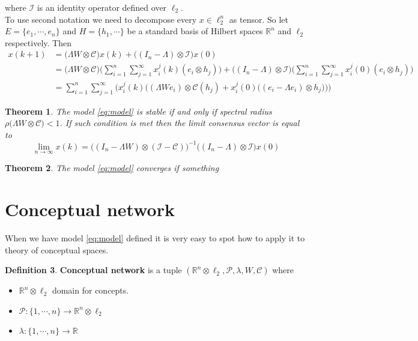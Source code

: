 \documentclass[leqno,12pt]{amsart}
\newtheorem{theorem}{Theorem}[section]
\theoremstyle{remark}
\theoremstyle{remark}
\theoremstyle{remark}
\theoremstyle{definition}
\newtheorem{definition}[theorem]{Definition}
\numberwithin{equation}{section}
\newcommand{\R}{\ensuremath{\mathbb{R}}}
\begin{document}
where $\mathcal{I}$ is an identity operator defined over $\ell_2$.\\
To use second notation we need to decompose every $x \in \ell_2^n$ as tensor. So let $E = \{ e_1, \cdots, e_n\}$ and $H = \{ h_1, \cdots\}$ be a standard basis of Hilbert spaces $\R^n$ and $\ell_2$ respectively. Then
\begin{align*}
    x(k+1) &= \big(\Lambda W\otimes \mathcal{C}\big)x(k) + \big((I_n - \Lambda)\otimes \mathcal{I}\big)x(0) \\
    &= \big(\Lambda W\otimes \mathcal{C}\big)\big(\sum\limits_{i=1}^n\sum\limits_{j=1}^\infty x^j_i(k)(e_i\otimes h_j)\big) + \big((I_n - \Lambda)\otimes \mathcal{I}\big)\big(\sum\limits_{i=1}^n\sum\limits_{j=1}^\infty x^j_i(0)(e_i\otimes h_j)\big)\\
    &= \sum\limits_{i=1}^n\sum\limits_{j=1}^\infty \Big(
    x_i^j(k)\big((\Lambda W e_i)\otimes \mathcal{C}(h_j) + x_i^j(0) \big((e_i-\Lambda e_i)\otimes h_j\big)\big)
    \Big)
\end{align*}
\begin{theorem}\label{th:stab_inf}
    The model \ref{eq:model} is stable if and only if spectral radius $\rho\big(\Lambda W\otimes \mathcal{C}\big) < 1$. If such condition is met then the limit \textit{consensus} vector is equal to
    \begin{equation}
        \lim\limits_{n\to \infty}x(k) = \big((I_n-\Lambda W)\otimes (\mathcal{I}- \mathcal{C})\big)^{-1}\big((I_n-\Lambda)\otimes \mathcal{I}\big)x(0)
    \end{equation}
\end{theorem}
\begin{theorem}
    The model \ref{eq:model} converges if something
    
\end{theorem}
\section{Conceptual network}
When we have model \ref{eq:model} defined it is very easy to spot how to apply it to theory of conceptual spaces.
\begin{definition}
    \textbf{Conceptual network} is a tuple $(\R^n\otimes \ell_2, \mathcal{P}, \lambda,  W, \mathcal{C})$ where 
    \begin{itemize}
        \item $\R^n\otimes \ell_2$ domain for concepts.
        \item $\mathcal{P} :\{1,\cdots, n\} \to \R^n\otimes \ell_2$
        \item $\lambda : \{1,\cdots, n\} \to \R$
    \end{itemize}
\end{definition}
\end{document}
